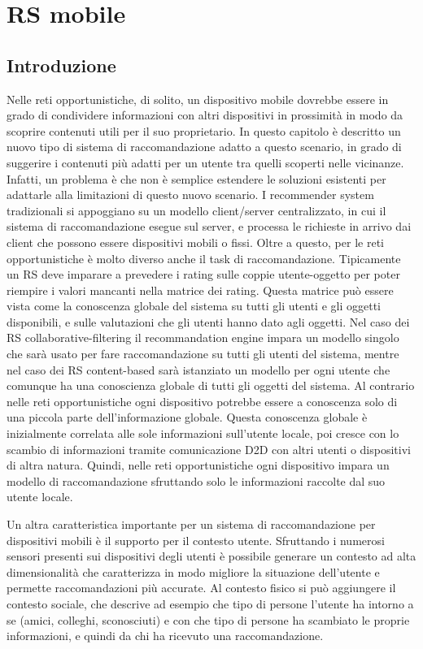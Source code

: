 \documentclass[12pt,italian]{report}
\begin{document}
% 
% 

\chapter{RS mobile}
\label{chap:classificatore}
\section{Introduzione}

Nelle reti opportunistiche, di solito, un dispositivo mobile dovrebbe essere in grado di condividere informazioni con altri dispositivi in prossimità in modo da scoprire contenuti utili per il suo proprietario. In questo capitolo è descritto un nuovo tipo di sistema di raccomandazione adatto a questo scenario, in grado di suggerire i contenuti più adatti per un utente tra quelli scoperti nelle vicinanze. Infatti, un problema è che non è semplice estendere le soluzioni esistenti per adattarle alla limitazioni di questo nuovo scenario. I recommender system tradizionali si appoggiano su un modello client/server centralizzato, in cui il sistema di raccomandazione esegue sul server, e processa le richieste in arrivo dai client che possono essere dispositivi mobili o fissi. Oltre a questo, per le reti opportunistiche è molto diverso anche il task di raccomandazione. Tipicamente un RS deve imparare a prevedere i rating sulle coppie utente-oggetto per poter riempire i valori mancanti nella matrice dei rating. Questa matrice può essere vista come la conoscenza globale del sistema su tutti gli utenti e gli oggetti disponibili, e sulle valutazioni che gli utenti hanno dato agli oggetti. Nel caso dei RS collaborative-filtering il recommandation engine impara un modello singolo che sarà usato per fare raccomandazione su tutti gli utenti del sistema, mentre nel caso dei RS content-based sarà istanziato un modello per ogni utente che comunque ha una conoscienza globale di tutti gli oggetti del sistema. Al contrario nelle reti opportunistiche ogni dispositivo potrebbe essere a conoscenza solo di una piccola parte dell'informazione globale. Questa conoscenza globale è inizialmente correlata alle sole informazioni sull'utente locale, poi cresce con lo scambio di informazioni tramite comunicazione D2D con altri utenti o dispositivi di altra natura. Quindi, nelle reti opportunistiche ogni dispositivo impara un modello di raccomandazione sfruttando solo le informazioni raccolte dal suo utente locale. 

Un altra caratteristica importante per un sistema di raccomandazione per dispositivi mobili è il supporto per il contesto utente. Sfruttando i numerosi sensori presenti sui dispositivi degli utenti è possibile generare un contesto ad alta dimensionalità che caratterizza in modo migliore la situazione dell'utente e permette raccomandazioni più accurate. Al contesto fisico si può aggiungere il contesto sociale, che descrive ad esempio che tipo di persone l'utente ha intorno a se (amici, colleghi, sconosciuti) e con che tipo di persone ha scambiato le proprie informazioni, e quindi da chi ha ricevuto una raccomandazione.
\end{document}
